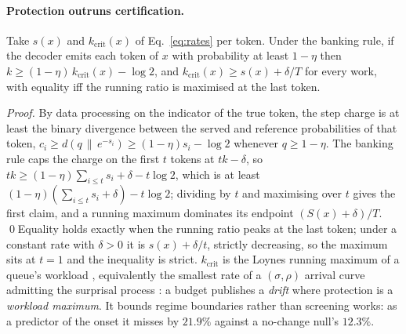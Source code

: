 \paragraph{Protection outruns certification.}
\begin{proposition}\label{prop:outrun}
Take $s(x)$ and $k_{\mathrm{crit}}(x)$ of Eq.~\eqref{eq:rates} per token. Under the banking rule, if the
decoder emits each token of $x$ with probability at least $1-\eta$ then
$k \ge (1-\eta)\,k_{\mathrm{crit}}(x) - \log 2$, and $k_{\mathrm{crit}}(x) \ge s(x) + \delta/T$ for every work,
with equality iff the running ratio is maximised at the last token.
\end{proposition}
\emph{Proof.} By data processing on the indicator of the true token, the step charge is at least the binary
divergence between the served and reference probabilities of that token,
$c_i \ge d(q \,\|\, e^{-s_i}) \ge (1-\eta)s_i - \log 2$ whenever $q \ge 1-\eta$. The banking rule
\citep[Algorithm~1]{he2026anchored} caps the charge on the first $t$ tokens at $tk - \delta$, so
$tk \ge (1-\eta)\sum_{i \le t} s_i + \delta - t\log 2$, which is at least
$(1-\eta)(\sum_{i \le t} s_i + \delta) - t\log 2$; dividing by $t$ and maximising over $t$ gives the
first claim, and a running maximum dominates its endpoint $(S(x)+\delta)/T$. \qed Equality holds exactly when the running ratio peaks at the last token; under a constant rate with $\delta > 0$ it is $s(x) + \delta/t$, strictly decreasing, so the maximum sits at $t=1$ and the inequality is strict.
$k_{\mathrm{crit}}$ is the Loynes running maximum of a queue's workload \citep{loynes1962stability},
equivalently the smallest rate of a $(\sigma,\rho)$ arrival curve admitting the surprisal process
\citep{cruz1991calculus,leboudec2001network}: a budget publishes a \emph{drift} where protection is a
\emph{workload maximum}. It bounds regime boundaries rather than screening works: as a predictor of the
onset it misses by $21.9\%$ against a no-change null's $12.3\%$.
